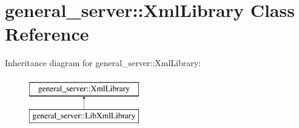 \hypertarget{classgeneral__server_1_1XmlLibrary}{\section{general\-\_\-server\-:\-:\-Xml\-Library \-Class \-Reference}
\label{classgeneral__server_1_1XmlLibrary}
}
\-Inheritance diagram for general\-\_\-server\-:\-:\-Xml\-Library\-:\begin{figure}[H]
\begin{center}
\leavevmode
\includegraphics[height=2.000000cm]{classgeneral__server_1_1XmlLibrary}
\end{center}
\end{figure}
